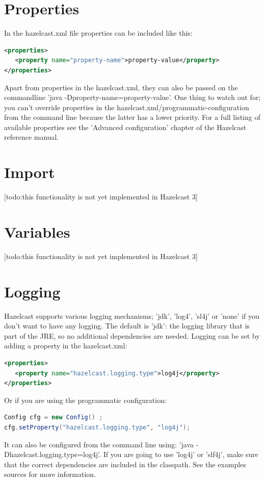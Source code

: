 \section{Properties}
In the hazelcast.xml file properties can be included like this:
\begin{lstlisting}[language=xml]
<properties>
   <property name="property-name">property-value</property>
</properties>
\end{lstlisting}
Apart from properties in the hazelcast.xml, they can also be passed on the commandline 'java -Dproperty-name=property-value'. One thing to watch out for; you can't override properties in the hazelcast.xml/programmatic-configuration from the command line because the latter has a lower priority. For a full listing of available properties see the 'Advanced configuration' chapter of the Hazelcast reference manual.

\section{Import}
[todo:this functionality is not yet implemented in Hazelcast 3]

\section{Variables}
[todo:this functionality is not yet implemented in Hazelcast 3]

\section{Logging}
Hazelcast supports various logging mechanisms; 'jdk', 'log4', 'sl4j' or 'none' if you don't want to have any logging. The default is 'jdk': the logging library that is part of the JRE, so no additional dependencies are needed. Logging can be set by adding a property in the hazelcast.xml:
\begin{lstlisting}[language=xml]
<properties>
   <property name="hazelcast.logging.type">log4j</property>
</properties>
\end{lstlisting}
Or if you are using the programmatic configuration:
\begin{lstlisting}[language=java]
Config cfg = new Config() ;
cfg.setProperty("hazelcast.logging.type", "log4j");
\end{lstlisting}
It can also be configured from the command line using: 'java -Dhazelcast.logging.type=log4j'. If you are going to  use 'log4j' or 'slf4j', make sure that the correct dependencies are included in the classpath. See the examples sources for more information.

